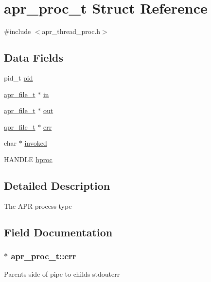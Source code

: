 \hypertarget{structapr__proc__t}{}\section{apr\+\_\+proc\+\_\+t Struct Reference}
\label{structapr__proc__t}


{\ttfamily \#include $<$apr\+\_\+thread\+\_\+proc.\+h$>$}

\subsection*{Data Fields}
\begin{DoxyCompactItemize}
\item 
pid\+\_\+t \hyperlink{structapr__proc__t_a8a8ee4b234156485a72497023e7482e5}{pid}
\item 
\hyperlink{group__apr__file__io_gaa46e4763ac375ea3c7a43ba6f6099e22}{apr\+\_\+file\+\_\+t} $\ast$ \hyperlink{structapr__proc__t_a914bda8939f9d17c9e2f238683fb994b}{in}
\item 
\hyperlink{group__apr__file__io_gaa46e4763ac375ea3c7a43ba6f6099e22}{apr\+\_\+file\+\_\+t} $\ast$ \hyperlink{structapr__proc__t_acb7d7c5226217946d761f0e90ff70d24}{out}
\item 
\hyperlink{group__apr__file__io_gaa46e4763ac375ea3c7a43ba6f6099e22}{apr\+\_\+file\+\_\+t} $\ast$ \hyperlink{structapr__proc__t_ad087f812b5c69ce937db4cf6e8cd5a0b}{err}
\item 
char $\ast$ \hyperlink{structapr__proc__t_a72ed1c58c3f08ffa7202fa80e870cd54}{invoked}
\item 
H\+A\+N\+D\+LE \hyperlink{structapr__proc__t_aa1f17cce2b442d92893b9c63053b6771}{hproc}
\end{DoxyCompactItemize}


\subsection{Detailed Description}
The A\+PR process type 

\subsection{Field Documentation}
\subsubsection[{\texorpdfstring{err}{err}}]{$\ast$ apr\+\_\+proc\+\_\+t\+::err}\hypertarget{structapr__proc__t_ad087f812b5c69ce937db4cf6e8cd5a0b}{}\label{structapr__proc__t_ad087f812b5c69ce937db4cf6e8cd5a0b}
Parent\textquotesingle{}s side of pipe to child\textquotesingle{}s stdouterr 
